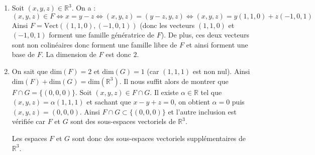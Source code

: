 \documentclass[a4paper,10pt]{report}
\begin{document}
\corr \begin{enumerate}
\item Soit $(x,y,z) \in \mathbb{R}^3$. On a :
$$ (x,y,z) \in F \Longleftrightarrow x=y-z \Longleftrightarrow (x,y,z) = (y-z,y,z) \Longleftrightarrow (x,y,z) = y(1,1,0) + z(-1,0,1)$$
Ainsi $F = \textrm{Vect}((1,1,0), (-1,0,1))$ (donc les vecteurs $(1,1,0)$ et $(-1,0,1)$ forment une famille génératrice de $F$). De plus, ces deux vecteurs sont non colinéaires donc forment une famille libre de $F$ et ainsi forment une base de $F$. La dimension de $F$ est donc $2$.
\item On sait que $\textrm{dim}(F)=2$ et $\textrm{dim}(G)=1$ (car $(1,1,1)$ est non nul). Ainsi $\textrm{dim}(F) + \textrm{dim}(G) = \textrm{dim}(\mathbb{R}^3)$. Il nous suffit alors de montrer que $F \cap G = \lbrace (0,0,0) \rbrace$. Soit $(x,y,z) \in F \cap G$. Il existe $\alpha \in \mathbb{R}$ tel que $(x,y,z) = \alpha (1,1,1)$ et sachant que $x-y+z=0$, on obtient $\alpha = 0$ puis $(x,y,z)=(0,0,0)$. Ainsi $F \cap G \subset \lbrace (0,0,0) \rbrace$ et l'autre inclusion est vérifiée car $F$ et $G$ sont des sous-espaces vectoriels de $\mathbb{R}^3$.

\medskip

\noindent Les espaces $F$ et $G$ sont donc des sous-espaces vectoriels supplémentaires de $\mathbb{R}^3$.
\end{enumerate}
\end{document}
